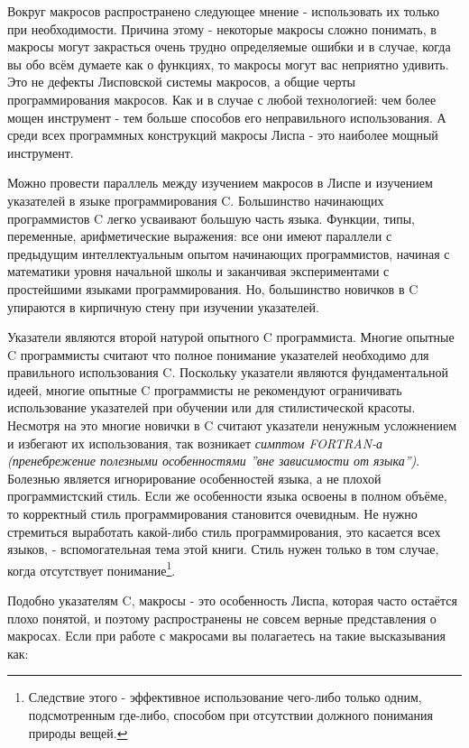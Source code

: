 Вокруг макросов распространено следующее мнение - использовать их только при необходимости. Причина этому - некоторые макросы сложно понимать, в макросы могут закрасться очень трудно определяемые ошибки и в случае, когда вы обо всём думаете как о функциях, то макросы могут вас неприятно удивить. Это не дефекты Лисповской системы макросов, а общие черты программирования макросов. Как и в случае с любой технологией: чем более мощен инструмент - тем больше способов его неправильного использования. А среди всех программных конструкций макросы Лиспа - это наиболее мощный инструмент.

Можно провести параллель между изучением макросов в Лиспе и изучением указателей в языке программирования C. Большинство начинающих программистов C легко усваивают большую часть языка. Функции, типы, переменные, арифметические выражения: все они имеют параллели с предыдущим интеллектуальным опытом начинающих программистов, начиная с математики уровня начальной школы и заканчивая экспериментами с простейшими языками программирования. Но, большинство новичков в C упираются в кирпичную стену при изучении указателей.

Указатели являются второй натурой опытного C программиста. Многие опытные C программисты считают что полное понимание указателей необходимо для правильного использования C. Поскольку указатели являются фундаментальной идеей, многие опытные C программисты не рекомендуют ограничивать использование указателей при обучении или для стилистической красоты. Несмотря на это многие новички в C считают указатели ненужным усложнением и избегают их использования, так возникает \emph{симптом FORTRAN-а (пренебрежение полезными особенностями ''вне зависимости от языка'')}. Болезнью является игнорирование особенностей языка, а не плохой программистский стиль. Если же особенности языка освоены в полном объёме, то корректный стиль программирования становится очевидным. Не нужно стремиться выработать какой-либо стиль программирования, это касается всех языков, - вспомогательная тема этой книги. Стиль нужен только в том случае, когда отсутствует понимание\footnote{Следствие этого - эффективное использование чего-либо только одним, подсмотренным где-либо, способом при отсутствии должного понимания природы вещей.}.

Подобно указателям C, макросы - это особенность Лиспа, которая часто остаётся плохо понятой, и поэтому распространены не совсем верные представления о макросах. Если при работе с макросами вы полагаетесь на такие высказывания как:

